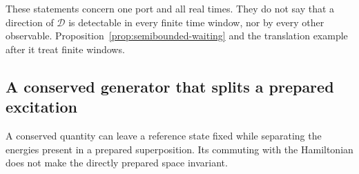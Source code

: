 \documentclass[11pt]{article}
\theoremstyle{definition}
\begin{document}
These statements concern one port and all real times. They do not say that a direction of $\mathcal D$ is detectable in every finite time window, nor by every other observable. Proposition~\ref{prop:semibounded-waiting} and the translation example after it treat finite windows.

\subsection{A conserved generator that splits a prepared excitation}
\label{subsec:passive-sectors}

A conserved quantity can leave a reference state fixed while separating the energies present in a prepared superposition. Its commuting with the Hamiltonian does not make the directly prepared space invariant.
\end{document}
